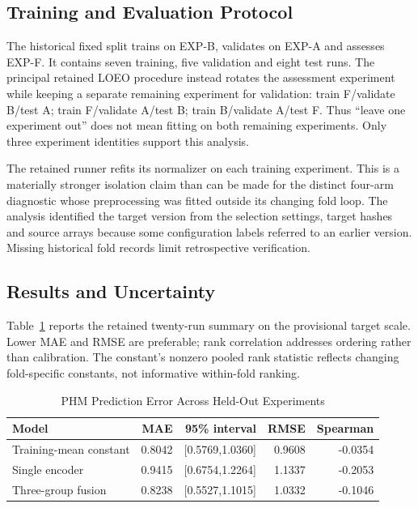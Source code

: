 \subsection{Training and Evaluation Protocol}
The historical fixed split trains on EXP-B, validates on EXP-A and assesses EXP-F. It
contains seven training, five validation and eight test runs. The principal retained
LOEO procedure instead rotates the assessment experiment while keeping a separate
remaining experiment for validation: train F/validate B/test A; train F/validate A/test
B; train B/validate A/test F. Thus ``leave one experiment out'' does not mean fitting on
both remaining experiments. Only three experiment identities support this analysis.

The retained runner refits its normalizer on each training experiment. This is a
materially stronger isolation claim than can be made for the distinct four-arm
diagnostic whose preprocessing was fitted outside its changing fold loop. The analysis
identified the target version from the selection settings, target hashes and source
arrays because some configuration labels referred to an earlier version. Missing
historical fold records limit retrospective verification.

\subsection{Results and Uncertainty}
Table~\ref{tab:phm-loeo} reports the retained twenty-run summary on the provisional
target scale. Lower MAE and RMSE are preferable; rank correlation addresses ordering
rather than calibration. The constant's nonzero pooled rank statistic reflects changing
fold-specific constants, not informative within-fold ranking.

\begin{table}[htbp]
\caption{PHM Prediction Error Across Held-Out Experiments}\label{tab:phm-loeo}
\centering\small
\begin{tabular}{lrrrr}\toprule
Model & MAE & 95\% interval & RMSE & Spearman\\\midrule
Training-mean constant &0.8042 &[0.5769,1.0360]&0.9608&-0.0354\\
Single encoder &0.9415 &[0.6754,1.2264]&1.1337&-0.2053\\
Three-group fusion &0.8238 &[0.5527,1.1015]&1.0332&-0.1046\\\bottomrule
\end{tabular}
\end{table}

